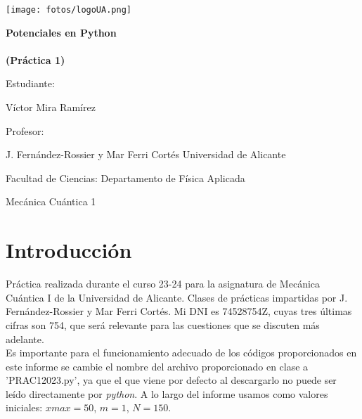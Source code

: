 \documentclass[11pt]{article}
\newcommand{\titulo}{Potenciales en Python\\\ \\(Práctica 1)}
\newcommand{\nombreestudiante}{Víctor Mira Ramírez}
\newcommand{\nombredirector}{J. Fernández-Rossier y Mar Ferri Cortés}
\newcommand{\fecha}{\date{Octubre 2023}}  %
\begin{document}
\begin{titlepage}
	\centering
	\texttt{[image: fotos/logoUA.png]}\par
	\vspace{1cm}
	{\huge\bfseries \vspace{15mm} \titulo \par}
	\vfill
	{\large 
	\vfill
	Estudiante:\par\vspace{2mm}
	\nombreestudiante\par
	\vfill
	Profesor:\par\vspace{2mm}
    \nombredirector
    \vfill
    Universidad de Alicante\par
    Facultad de Ciencias: Departamento de Física Aplicada\par
    Mecánica Cuántica 1\par
	\fecha\par}
\end{titlepage}

\pagebreak

\begin{abstract}\label{sec:abstract}
    \noindent El objetivo de esta práctica es aprender a resolver la ecuación de Schrödinger en una dimensión para potenciales arbitrarios de forma numérica usando \textit{Python}. Para ello se estudiaran dos problemas propuestos y se discutirá brevemente la física que les concierne: el efecto túnel y túnel resonante, así como los estados ligados de potenciales en una dimensión.
\end{abstract}

\tableofcontents

\section*{Introducción}
    \noindent Práctica realizada durante el curso 23-24 para la asignatura de Mecánica Cuántica I de la Universidad de Alicante. Clases de prácticas impartidas por J. Fernández-Rossier y Mar Ferri Cortés. Mi DNI es 74528754Z, cuyas tres últimas cifras son 754, que será relevante para las cuestiones que se discuten más adelante.\\
    
    \noindent Es importante para el funcionamiento adecuado de los códigos proporcionados en este informe se cambie el nombre del archivo proporcionado en clase a 'PRAC12023.py', ya que el que viene por defecto al descargarlo no puede ser leído directamente por \textit{python}. A lo largo del informe usamos como valores iniciales: $xmax=50$, $m=1$, $N=150$.
    
\end{document}
